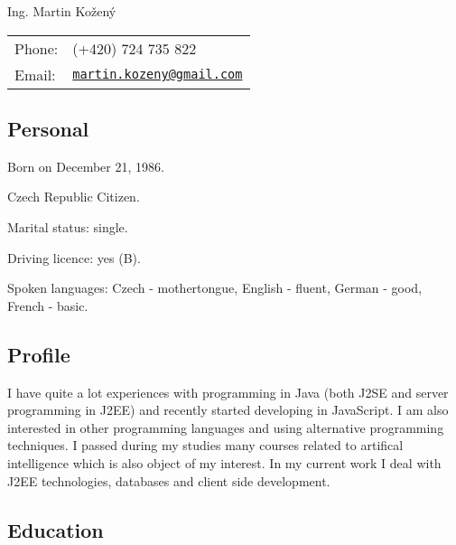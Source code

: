 \documentclass[czech]{article}
\def\name{Ing. Martin Kožený}
\renewenvironment{itemize}{
  \begin{list}{}{
    \setlength{\leftmargin}{1.5em}
  }
}{
  \end{list}
}
\begin{document}
{\huge \name}


\vspace{0.1in}

\begin{minipage}{0.45\linewidth}
  \begin{tabular}{ll}
    Phone: & (+420) 724 735 822 \\
    Email: & \href{mailto:martin.kozeny@gmail.com}{\tt martin.kozeny@gmail.com}
    
  \end{tabular}
\end{minipage}

\textcolor{coolblack}{\section*{Personal}}

\begin{itemize}
\item Born on December 21, 1986.
\item Czech Republic Citizen.
\item Marital status: single.
\item Driving licence: yes (B).
\item Spoken languages: Czech - mothertongue, English - fluent, German - good,
French - basic.
\end{itemize}

\textcolor{coolblack}{\section*{Profile}}
I have quite a lot experiences with programming in Java (both J2SE and server programming in J2EE) and recently started developing in JavaScript. I am also interested in other programming languages and using alternative
programming techniques. I passed during my studies many courses related to
artifical intelligence which is also object of my interest. In my current work I
deal with J2EE technologies, databases and client side development.

\textcolor{coolblack}{\section*{Education}}
\end{document}
